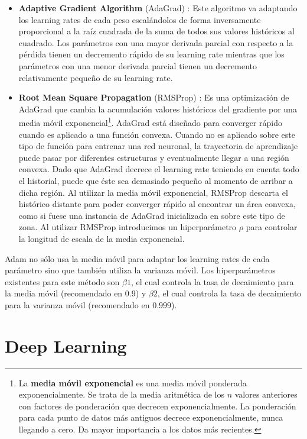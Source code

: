 \documentclass[spanish]{report}
\begin{document}
\begin{itemize}
\item{\textbf{Adaptive Gradient Algorithm} (AdaGrad) \cite{deep_learning_book}: Este algoritmo va adaptando los learning rates de cada peso escalándolos de forma inversamente proporcional a la raíz cuadrada de la suma de todos sus valores históricos al cuadrado. Los parámetros con una mayor derivada parcial con respecto a la pérdida tienen un decremento rápido de su learning rate mientras que los parámetros con una menor derivada parcial tienen un decremento relativamente pequeño de su learning rate.}

\item{\textbf{Root Mean Square Propagation} (RMSProp) \cite{deep_learning_book}}: Es una optimización de AdaGrad que cambia la acumulación valores históricos del gradiente por una media móvil exponencial\footnote{La \textbf{media móvil exponencial} es una media móvil ponderada exponencialmente. Se trata de la media aritmética de los $n$ valores anteriores con factores de ponderación que decrecen exponencialmente. La ponderación para cada punto de datos más antiguos decrece exponencialmente, nunca llegando a cero. Da mayor importancia a los datos más recientes.}. AdaGrad está diseñado para converger rápido cuando es aplicado a una función convexa. Cuando no es aplicado sobre este tipo de función para entrenar una red neuronal, la trayectoria de aprendizaje puede pasar por diferentes estructuras y eventualmente llegar a una región convexa. Dado que AdaGrad decrece el learning rate teniendo en cuenta todo el historial, puede que éste sea demasiado pequeño al momento de arribar a dicha región. Al utilizar la media móvil exponencial, RMSProp descarta el histórico distante para poder converger rápido al encontrar un área convexa, como si fuese una instancia de AdaGrad inicializada en sobre este tipo de zona. Al utilizar RMSProp introducimos un hiperparámetro $\rho$ para controlar la longitud de escala de la media exponencial.

\end{itemize}

\noindent Adam no sólo usa la media móvil para adaptar los learning rates de cada parámetro sino que también utiliza la varianza móvil. Los hiperparámetros existentes para este método son $\beta 1$, el cual controla la tasa de decaimiento para la media móvil (recomendado en $0.9$) y $\beta 2$, el cual controla la tasa de decaimiento para la varianza móvil (recomendado en $0.999$).

\section{Deep Learning}
\end{document}
